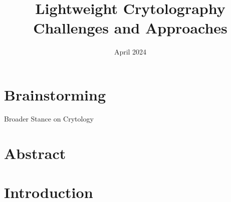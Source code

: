 \documentclass{article}
\title{Lightweight Crytolography Challenges and Approaches}
\author{}
\date{April 2024}
\begin{document}
\maketitle
\section{Brainstorming} %
Broader Stance on Crytology


\section{Abstract} %

\section{Introduction} %

\end{document}
